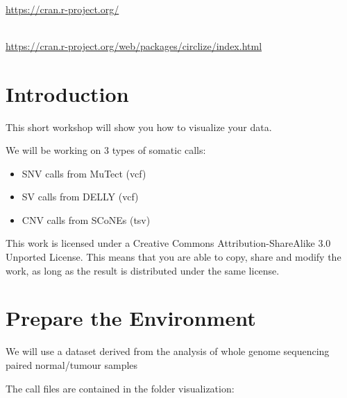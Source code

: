 \begin{description}[style=multiline,labelindent=0cm,align=left,leftmargin=1cm]
  \item[R] \hfill\\
    \url{https://cran.r-project.org/}
  \item[R package circlize] \hfill\\
    \url{https://cran.r-project.org/web/packages/circlize/index.html}

\end{description}


\newpage


\section{Introduction}

This short workshop will show you how to visualize your data.

We will be working on 3 types of somatic calls: 
\begin{itemize}
  \item SNV calls from MuTect (vcf)
  \item SV calls from DELLY (vcf)
  \item CNV calls from SCoNEs (tsv)
\end{itemize}

This work is licensed under a Creative Commons Attribution-ShareAlike 3.0 Unported License. This means that you are able to copy, share and modify the work, as long as the result is distributed under the same license.




\section{Prepare the Environment}

We will use a dataset derived from the analysis of whole genome sequencing paired normal/tumour samples

The call files are contained in the folder visualization:

